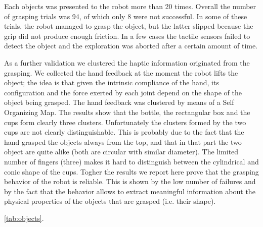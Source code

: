 Each objects was presented to the robot more than 20 times. Overall the number of
grasping trials was 94, of which only 8 were not successful. In some of these 
trials, the robot managed to grasp the object, but the latter slipped because
the grip did not produce enough friction. In a few cases the tactile sensors failed 
to detect the object and the exploration was aborted after a certain amount of 
time.

As a further validation we clustered the haptic information originated from 
the grasping. We collected the hand feedback at the moment the robot lifts the 
object; the idea is that given the intrinsic compliance of the hand, its 
configuration and the force exerted by each joint depend on the shape of the
object being grasped.
The hand feedback was clustered by means of a Self Organizing Map. The results 
show that the bottle, the rectangular box and the cups form clearly three clusters. 
Unfortunately the clusters formed by the two cups are not clearly distinguishable. 
This is probably due to the fact that the hand grasped the objects always from the
top, and that in that part the two object are quite alike (both are circular with 
similar diameter). The limited number of fingers (three) makes it hard to 
distinguish between the cylindrical and conic shape of the cups.
Togher the results we report here prove that the grasping behavior of the robot 
is reliable. This is shown by the low number of failures and by the fact that 
the behavior allows to extract meaningful information about the physical properties 
of the objects that are grasped (i.e. their shape).

\ref{tab:objects}.





